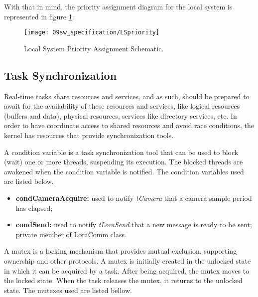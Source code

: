 With that in mind, the priority assignment diagram for the local system is represented in figure \ref{fig:lst_priority}.

\begin{figure}[H]
	\centering
	\texttt{[image: 09sw\_specification/LSpriority]}
	\caption{Local System Priority Assignment Schematic.}
	\label{fig:lst_priority}
\end{figure}

\subsection{Task Synchronization}
Real-time tasks share resources and services, and as such, should be prepared to await for the availability of these resources and services, like logical resources (buffers and data), physical resources, services like directory services, etc. In order to have coordinate access to shared resources and avoid race conditions, the kernel has resources that provide synchronization tools. 


A condition variable is a task synchronization tool that can be used to block (wait) one or more threads, suspending its execution. The blocked threads are awakened when the condition variable is notified. The condition variables used are listed below.

\begin{itemize}
	\item \textbf{condCameraAcquire:} used to notify \textit{tCamera} that a camera sample period has elapsed;
	\item \textbf{condSend:} used to notify \textit{tLoraSend} that a new message is ready to be sent; private member of LoraComm class.
\end{itemize}


A mutex is a locking mechanism that provides mutual exclusion, supporting ownership and other protocols. A mutex is initially created in the unlocked state in which it can be acquired by a task. After being acquired, the mutex moves to the locked state. When the task releases the mutex, it returns to the unlocked state. The mutexes used are listed bellow.

